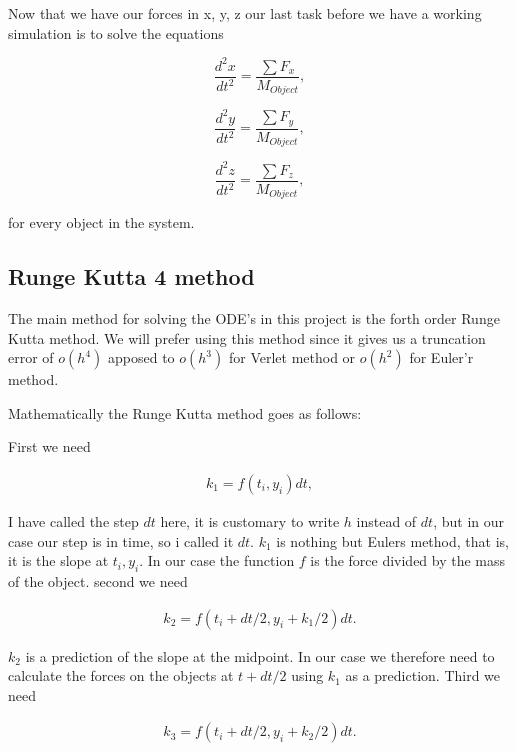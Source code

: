 \documentclass[norsk,a4paper,12pt]{article}
\begin{document}
Now that we have our forces in x, y, z our last task before we have a working simulation is to solve the equations

\begin{equation}
 \frac{d^2 x}{dt^2} = \frac{\sum F_x}{M_{Object}}, 
\end{equation}

\begin{equation}
 \frac{d^2 y}{dt^2} = \frac{\sum F_y}{M_{Object}}, 
\end{equation}

\begin{equation}
 \frac{d^2 z}{dt^2} = \frac{\sum F_z}{M_{Object}}, 
\end{equation}


for every object in the system.



\subsection*{Runge Kutta 4 method}

The main method for solving the ODE's in this project is the forth order Runge Kutta method. We will prefer using this method 
since it gives us a truncation error of $o(h^4)$ apposed to $o(h^3)$ for Verlet method or $o(h^2)$ for Euler'r method.

Mathematically the Runge Kutta method goes as follows:

First we need

\begin{align}
 k_1 = f(t_i, y_i)dt,
\end{align}

I have called the step $dt$ here, it is customary to write $h$ instead of $dt$, but in our case our step is in time, so i called
it $dt$. $k_1$ is nothing but Eulers method, that is, it is the slope at $t_i, y_i$. In our case the function $f$ is the force divided
by the mass of the object. second we need

\begin{align}
 k_2 = f(t_i + dt/2, y_i + k_{1}/2)dt.
\end{align}

$k_2$ is a prediction of the slope at the midpoint. In our case we therefore need to calculate the forces on the objects at $t + dt/2$
using $k_1$ as a prediction. Third we need 

\begin{align}
 k_3 = f(t_i + dt/2, y_i + k_{2}/2)dt.
\end{align}
\end{document}
